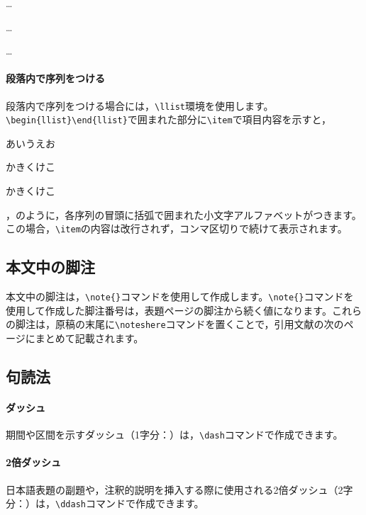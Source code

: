 \documentclass{jjpsy}
\begin{document}
\begin{plist}
  \item \ldots
  \item \ldots
  \item \ldots
\end{plist}

\paragraph{段落内で序列をつける}

段落内で序列をつける場合には，\texttt{\textbackslash{}llist}環境を使用します。\texttt{\textbackslash{}begin\{llist\}}\dash\texttt{\textbackslash{}end\{llist\}}で囲まれた部分に\texttt{\textbackslash{}item}で項目内容を示すと，
\begin{llist}
  \item あいうえお
  \item かきくけこ
  \item かきくけこ
\end{llist}
，のように，各序列の冒頭に括弧で囲まれた小文字アルファベットがつきます。この場合，\texttt{\textbackslash{}item}の内容は改行されず，コンマ区切りで続けて表示されます。

\subsection{本文中の脚注}
本文中の脚注は，\texttt{\textbackslash{}note\{\}}コマンドを使用して作成します。\texttt{\textbackslash{}note\{\}}コマンドを使用して作成した脚注番号は，表題ページの脚注から続く値になります。これらの脚注は，原稿の末尾に\texttt{\textbackslash{}noteshere}コマンドを置くことで，引用文献の次のページにまとめて記載されます。

\subsection{句読法}

\paragraph{ダッシュ}
期間や区間を示すダッシュ（1字分：\dash）は，\texttt{\textbackslash{}dash}コマンドで作成できます。

\paragraph{2倍ダッシュ}
日本語表題の副題や，注釈的説明を挿入する際に使用される2倍ダッシュ（2字分：\ddash）は，\texttt{\textbackslash{}ddash}コマンドで作成できます。
\end{document}
